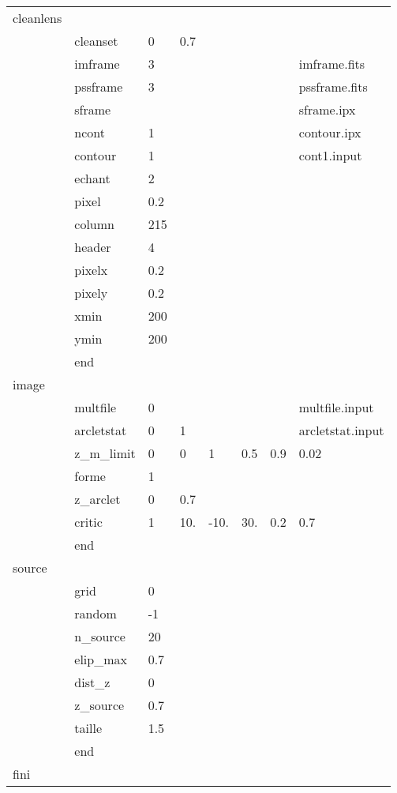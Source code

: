 \vfill\eject
{\bf
\begin{tabular}{llllllll}
cleanlens& & & & & & & \\
        &cleanset    &    0 & 0.7  & & & & \\
        &imframe     &    3 & & & & &imframe.fits   \\
        &pssframe    &    3 & & & & &pssframe.fits   \\
        &sframe      &   & & & & &sframe.ipx  \\
        &ncont       &   1 & & & & &contour.ipx   \\
        &contour     &   1 & & & & &cont1.input   \\
        &echant      &   2 & & & & & \\
        &pixel       &   0.2 & & & & & \\
        &column      &   215 & & & & & \\
        &header      &   4 & & & & & \\
        &pixelx      &   0.2 & & & & & \\
        &pixely      &   0.2 & & & & & \\
        &xmin        &   200  & & & & & \\
        &ymin        &   200   & & & & & \\
        &end& & & & & & \\
image& & & & & & & \\
        &multfile    &   0 & & & && multfile.input    \\
        &arcletstat  &   0 & 1 & &  & &arcletstat.input    \\
        &z\_m\_limit   &   0 & 0 & 1  &  0.5 &   0.9 &  0.02  \\
        &forme & 1   & & & & & \\
        &z\_arclet & 0 & 0.7 & & & & \\
        &critic      &   1  &10. & -10.&  30.&  0.2&  0.7 \\
        &end& & & & & &  \\
source& & & & & & & \\
        &grid        &   0 & &  & & & \\
        &random      &   -1 & &  & & & \\
        &n\_source    &   20 & &  & & & \\
        &elip\_max    &   0.7 & &  & & & \\
        &dist\_z      &   0 & &  & & & \\
        &z\_source    &   0.7  & &  & & & \\
        &taille      &   1.5  & & &  & & \\
        &end& & & & & & \\
fini& & & & & & & \\
\end{tabular}
}\\
\newpage
